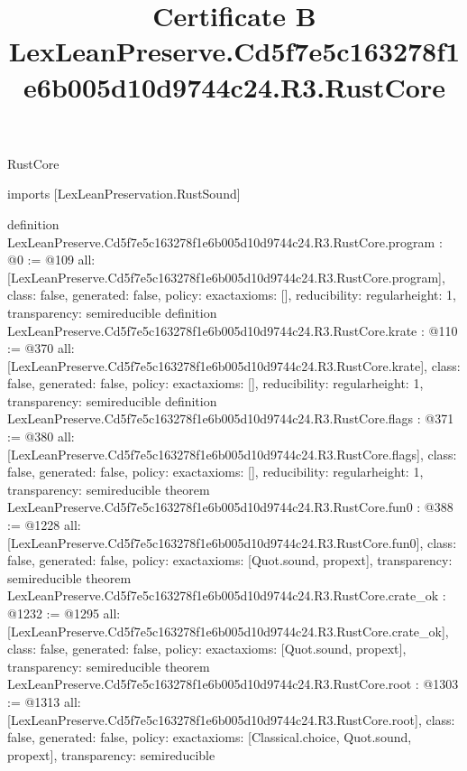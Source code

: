 \begin{lexlean}{RustCore}
\title{Certificate B LexLeanPreserve.Cd5f7e5c163278f1e6b005d10d9744c24.R3.RustCore}
\begin{coremodule}
imports [LexLeanPreservation.RustSound]

definition LexLeanPreserve.Cd5f7e5c163278f1e6b005d10d9744c24.R3.RustCore.program : @0 := @109 {
  all: [LexLeanPreserve.Cd5f7e5c163278f1e6b005d10d9744c24.R3.RustCore.program],
  class: false,
  generated: false,
  policy: exact{axioms: []},
  reducibility: regular{height: 1},
  transparency: semireducible
}
definition LexLeanPreserve.Cd5f7e5c163278f1e6b005d10d9744c24.R3.RustCore.krate : @110 := @370 {
  all: [LexLeanPreserve.Cd5f7e5c163278f1e6b005d10d9744c24.R3.RustCore.krate],
  class: false,
  generated: false,
  policy: exact{axioms: []},
  reducibility: regular{height: 1},
  transparency: semireducible
}
definition LexLeanPreserve.Cd5f7e5c163278f1e6b005d10d9744c24.R3.RustCore.flags : @371 := @380 {
  all: [LexLeanPreserve.Cd5f7e5c163278f1e6b005d10d9744c24.R3.RustCore.flags],
  class: false,
  generated: false,
  policy: exact{axioms: []},
  reducibility: regular{height: 1},
  transparency: semireducible
}
theorem LexLeanPreserve.Cd5f7e5c163278f1e6b005d10d9744c24.R3.RustCore.fun0 : @388 := @1228 {
  all: [LexLeanPreserve.Cd5f7e5c163278f1e6b005d10d9744c24.R3.RustCore.fun0],
  class: false,
  generated: false,
  policy: exact{axioms: [Quot.sound, propext]},
  transparency: semireducible
}
theorem LexLeanPreserve.Cd5f7e5c163278f1e6b005d10d9744c24.R3.RustCore.crate_ok : @1232 := @1295 {
  all: [LexLeanPreserve.Cd5f7e5c163278f1e6b005d10d9744c24.R3.RustCore.crate_ok],
  class: false,
  generated: false,
  policy: exact{axioms: [Quot.sound, propext]},
  transparency: semireducible
}
theorem LexLeanPreserve.Cd5f7e5c163278f1e6b005d10d9744c24.R3.RustCore.root : @1303 := @1313 {
  all: [LexLeanPreserve.Cd5f7e5c163278f1e6b005d10d9744c24.R3.RustCore.root],
  class: false,
  generated: false,
  policy: exact{axioms: [Classical.choice, Quot.sound, propext]},
  transparency: semireducible
}


\end{coremodule}
\end{lexlean}
